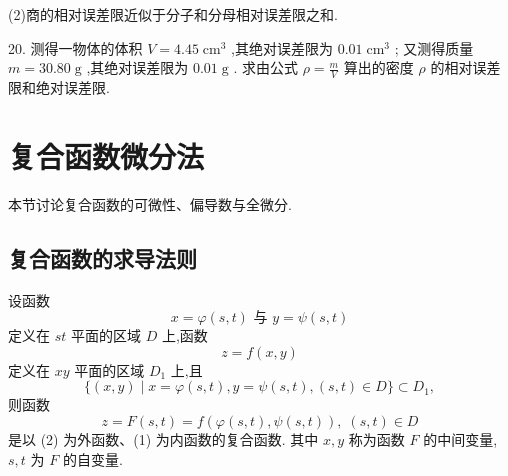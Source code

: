 (2)商的相对误差限近似于分子和分母相对误差限之和.

20. 测得一物体的体积 \(V = {4.45}{\mathrm{\;{cm}}}^{3}\) ,其绝对误差限为 \({0.01}{\mathrm{\;{cm}}}^{3}\) ; 又测得质量 \(m = {30.80}\mathrm{\;g}\) ,其绝对误差限为 \({0.01}\mathrm{\;g}\) . 求由公式 \(\rho  = \frac{m}{V}\) 算出的密度 \(\rho\) 的相对误差限和绝对误差限.

\section{复合函数微分法}

本节讨论复合函数的可微性、偏导数与全微分.

\subsection{复合函数的求导法则}

设函数
\[
x = \varphi \left( {s,t}\right) \text{ 与 }y = \psi \left( {s,t}\right)  \tag{1}
\]
定义在 \({st}\) 平面的区域 \(D\) 上,函数
\[
z = f\left( {x,y}\right)  \tag{2}
\]
定义在 \({xy}\) 平面的区域 \({D}_{1}\) 上,且
\[
\{ \left( {x,y}\right)  \mid  x = \varphi \left( {s,t}\right) ,y = \psi \left( {s,t}\right) ,\left( {s,t}\right)  \in  D\}  \subset  {D}_{1},
\]
则函数
\[
z = F\left( {s,t}\right)  = f\left( {\varphi \left( {s,t}\right) ,\psi \left( {s,t}\right) }\right) ,\;\left( {s,t}\right)  \in  D \tag{3}
\]
是以 (2) 为外函数、(1) 为内函数的复合函数. 其中 \(x,y\) 称为函数 \(F\) 的中间变量, \(s,t\) 为 \(F\) 的自变量.

